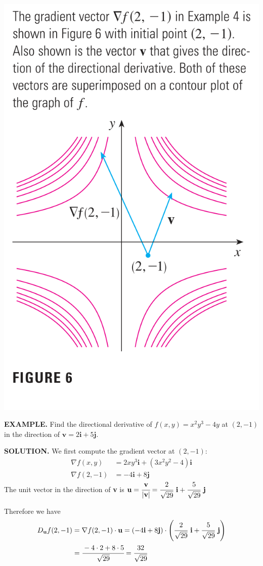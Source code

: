 \documentclass{article}
\begin{document}
\begin{minipage}[]{0.3\linewidth}
  \includegraphics[width = 4.3 cm]{./images/grad4.png}
  
\end{minipage}
\begin{minipage}[]{0.67\linewidth}
  {\selectfont \textbf{\textcolor{blue5}{ EXAMPLE.}}} Find the directional derivative of $f(x,y) = x^2 y^3 - 4y$ at $(2, -1 )$ in the direction of $\textbf{v} = 2 \textbf{i} + 5 \textbf{j}$.

  {\selectfont \textbf{\textcolor{blue5}{SOLUTION.}}} We first compute the gradient vector at $(2,-1)$: 
  \begin{align*}
    \nabla f(x,y) & = 2xy^3 \textbf{i} + (3 x^2 y^2 - 4 ) \textbf{i} \\
    \nabla f(2, -1) & = -4 \textbf{i} + 8 \textbf{j}
  \end{align*}
  The unit vector in the direction of \textbf{v} is $\textbf{u} = \cfrac{\textbf{v}}{|\textbf{v}|} = \cfrac{2 }{\sqrt{29 }} \textbf{ i} + \cfrac{5 }{\sqrt{29 }} \textbf{ j}$

  Therefore we have 
  \begin{align*}
    D_ \textbf{u} f(2,-1) & = \nabla f(2,-1) \cdot \textbf{u} = (-4 \textbf{i} + 8 \textbf{j}) \cdot \left( \cfrac{2 }{\sqrt{29 }} \textbf{ i} + \cfrac{5 }{\sqrt{29 }} \textbf{ j}  \right)\\
    & = \cfrac{-4 \cdot 2 + 8 \cdot 5  }{\sqrt{29}} = \cfrac{32 }{\sqrt{29 }}
  \end{align*}
\end{minipage}
\end{document}
